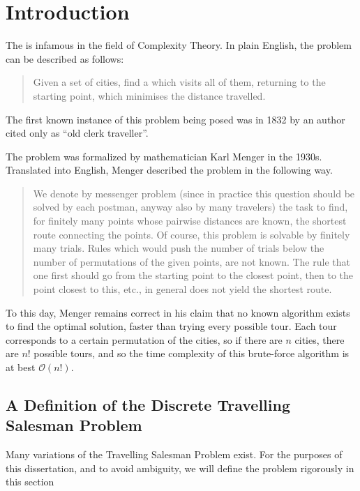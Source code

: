 \chapter{Introduction}

The  is infamous in the field of Complexity Theory. In plain English, the problem can be described as follows:

\begin{quote}
  Given a set of cities, find a  which visits all of them, returning to the starting point, which minimises the distance travelled.
\end{quote}

The first known instance of this problem being posed was in 1832 by an author cited only as ``old clerk traveller''\cite{jal}.

The problem was formalized by mathematician Karl Menger in the 1930s\cite{lotz2014losung}. Translated into English\cite{schrijver2005history}, Menger described the problem in the following way.

\begin{quote}
  We denote by messenger problem (since in practice this question should be solved by each postman, anyway also by many travelers) the task to find, for finitely many points whose pairwise distances are known, the shortest route connecting the points. Of course, this problem is solvable by finitely many trials. Rules which would push the number of trials below the number of permutations of the given points, are not known. The rule that one first should go from the starting point to the closest point, then to the point closest to this, etc., in general does not yield the shortest route.
\end{quote}

To this day, Menger remains correct in his claim that no known algorithm exists to find the optimal solution, faster than trying every possible tour. Each tour corresponds to a certain permutation of the cities, so if there are $n$ cities, there are $n!$ possible tours, and so the time complexity of this brute-force algorithm is at best $\mathcal{O}(n!)$.

\section{A Definition of the Discrete Travelling Salesman Problem}

Many variations of the Travelling Salesman Problem exist. For the purposes of this dissertation, and to avoid ambiguity, we will define the problem rigorously in this section

